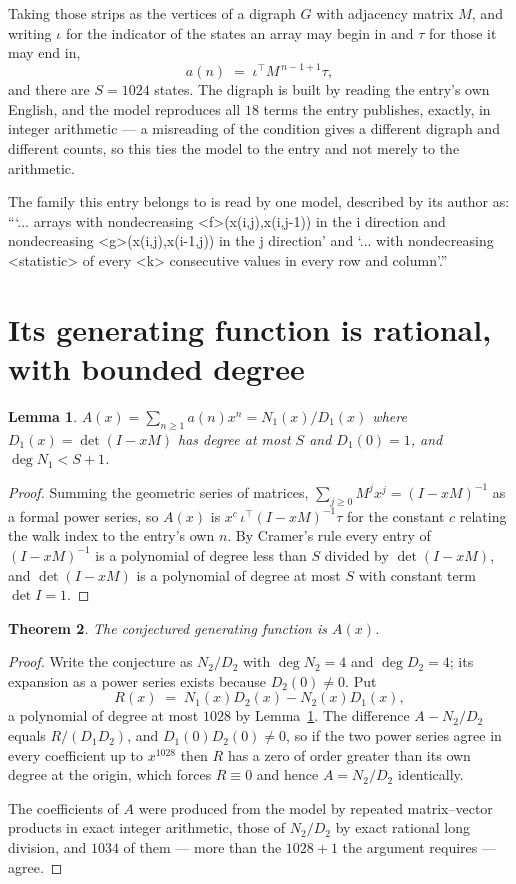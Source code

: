 \documentclass[11pt,a4paper]{article}
\theoremstyle{plain}
\newtheorem{theorem}{Theorem}
\newtheorem{lemma}[theorem]{Lemma}
\theoremstyle{definition}
\begin{document}
Taking those strips as the vertices of a digraph $G$ with adjacency matrix $M$, and writing
$\iota$ for the indicator of the states an array may begin in and $\tau$ for those it may end
in,
\[
a(n)\;=\;\iota^{\!\top}M^{\,n-1+1}\tau ,
\]
and there are $S=1024$ states. The digraph is built by reading the entry's own English, and the
model reproduces all $18$ terms the entry publishes, exactly, in integer arithmetic --- a
misreading of the condition gives a different digraph and different counts, so this ties the
model to the entry and not merely to the arithmetic.

The family this entry belongs to is read by one model, described by its author as: ```... arrays with nondecreasing <f>(x(i,j),x(i,j-1)) in the i direction and nondecreasing <g>(x(i,j),x(i-1,j)) in the j direction' and `... with nondecreasing <statistic> of every <k> consecutive values in every row and column'.''


\section{Its generating function is rational, with bounded degree}

\begin{lemma}\label{lem:rat}
$A(x)=\sum_{n\ge1}a(n)x^n=N_1(x)/D_1(x)$ where $D_1(x)=\det(I-xM)$ has degree at most
$S$ and $D_1(0)=1$, and $\deg N_1<S+1$.
\end{lemma}

\begin{proof}
Summing the geometric series of matrices, $\sum_{j\ge0}M^jx^j=(I-xM)^{-1}$ as a formal
power series, so $A(x)$ is $x^{c}\,\iota^{\!\top}(I-xM)^{-1}\tau$ for the constant $c$
relating the walk index to the entry's own $n$. By Cramer's rule every entry of
$(I-xM)^{-1}$ is a polynomial of degree less than $S$ divided by $\det(I-xM)$, and
$\det(I-xM)$ is a polynomial of degree at most $S$ with constant term $\det I=1$.
\end{proof}

\begin{theorem}
The conjectured generating function is $A(x)$.
\end{theorem}

\begin{proof}
Write the conjecture as $N_2/D_2$ with $\deg N_2=4$ and $\deg D_2=4$; its expansion as a
power series exists because $D_2(0)\neq0$. Put
\[
R(x)\;=\;N_1(x)D_2(x)-N_2(x)D_1(x),
\]
a polynomial of degree at most $1028$ by Lemma~\ref{lem:rat}. The difference
$A-N_2/D_2$ equals $R/(D_1D_2)$, and $D_1(0)D_2(0)\neq0$, so if the two power series agree in
every coefficient up to $x^{1028}$ then $R$ has a zero of order greater than its own
degree at the origin, which forces $R\equiv0$ and hence $A=N_2/D_2$ identically.

The coefficients of $A$ were produced from the model by repeated matrix--vector products in
exact integer arithmetic, those of $N_2/D_2$ by exact rational long division, and $1034$
of them --- more than the $1028+1$ the argument requires --- agree.
\end{proof}
\end{document}
